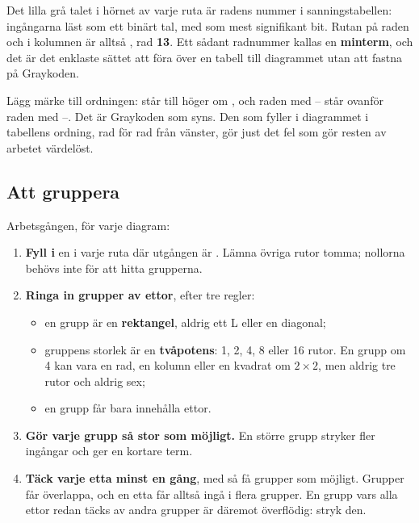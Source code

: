 
Det lilla grå talet i hörnet av varje ruta är radens nummer i sanningstabellen: ingångarna läst som
ett binärt tal, med  som mest signifikant bit. Rutan på raden  och i kolumnen
 är alltså , rad \textbf{13}. Ett sådant radnummer kallas en
\textbf{minterm}, och det är det enklaste sättet att föra över en tabell till diagrammet utan att
fastna på Graykoden.

Lägg märke till ordningen:  står till höger om , och raden med --
står ovanför raden med --. Det är Graykoden som syns. Den som fyller i diagrammet
i tabellens ordning, rad för rad från vänster, gör just det fel som gör resten av arbetet
värdelöst.

\subsection{Att gruppera}
\label{c4:a3}
Arbetsgången, för varje diagram:
\begin{enumerate}
  \item \textbf{Fyll i} en  i varje ruta där utgången är . Lämna övriga rutor
    tomma; nollorna behövs inte för att hitta grupperna.
  \item \textbf{Ringa in grupper av ettor}, efter tre regler:
    \begin{itemize}
      \item en grupp är en \textbf{rektangel}, aldrig ett L eller en diagonal;
      \item gruppens storlek är en \textbf{tvåpotens}: 1, 2, 4, 8 eller 16 rutor. En grupp om 4
        kan vara en rad, en kolumn eller en kvadrat om $2 \times 2$, men aldrig tre rutor och
        aldrig sex;
      \item en grupp får bara innehålla ettor.
    \end{itemize}
  \item \textbf{Gör varje grupp så stor som möjligt.} En större grupp stryker fler ingångar och ger
    en kortare term.
  \item \textbf{Täck varje etta minst en gång}, med så få grupper som möjligt. Grupper får
    överlappa, och en etta får alltså ingå i flera grupper. En grupp vars alla ettor redan täcks av
    andra grupper är däremot överflödig: stryk den.
\end{enumerate}

